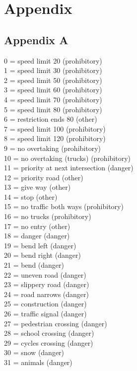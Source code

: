 \documentclass[12pt,a4paper,bibliography=totocnumbered,listof=totocnumbered]{scrartcl}
\begin{document}
\pagebreak
\section{Appendix}
\subsection{Appendix A}
0 = speed limit 20 (prohibitory) \\
1 = speed limit 30 (prohibitory) \\
2 = speed limit 50 (prohibitory)\\
3 = speed limit 60 (prohibitory)\\
4 = speed limit 70 (prohibitory)\\
5 = speed limit 80 (prohibitory)\\
6 = restriction ends 80 (other)\\
7 = speed limit 100 (prohibitory)\\
8 = speed limit 120 (prohibitory)\\
9 = no overtaking (prohibitory)\\
10 = no overtaking (trucks) (prohibitory)\\
11 = priority at next intersection (danger)\\
12 = priority road (other)\\
13 = give way (other)\\
14 = stop (other)\\
15 = no traffic both ways (prohibitory)\\
16 = no trucks (prohibitory)\\
17 = no entry (other)\\
18 = danger (danger)\\
19 = bend left (danger)\\
20 = bend right (danger)\\
21 = bend (danger)\\
22 = uneven road (danger)\\
23 = slippery road (danger)\\
24 = road narrows (danger)\\
25 = construction (danger)\\
26 = traffic signal (danger)\\
27 = pedestrian crossing (danger)\\
28 = school crossing (danger)\\
29 = cycles crossing (danger)\\
30 = snow (danger)\\
31 = animals (danger)\\
\end{document}
